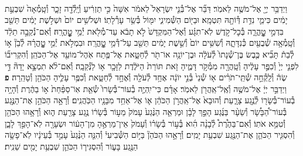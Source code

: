 \documentclass[twoside, openany, parskip=half, 11pt]{book}
\begin{document}
\begin{footnotesize}
\begin{multicols}{2}
\\
וַיְדַבֵּ֥ר יְיָ֖ אֶל־מֹשֶׁ֥ה לֵּאמֹֽר׃ דַּבֵּ֞ר אֶל־בְּ֯נֵ֤י יִשְׂרָאֵל֙ לֵאמֹ֔ר אִשָּׁה֙ כִּ֣י תַזְרִ֔יעַ וְ֯יָֽלְ֯דָ֖ה זָכָ֑ר וְ֯טָֽמְ֯אָה֙ שִׁבְעַ֣ת יָמִ֔ים כִּימֵ֛י נִדַּ֥ת דְּ֯וֹתָ֖הּ תִּטְמָֽא׃ וּבַיּ֖וֹם הַשְּׁ֯מִינִ֑י יִמּ֖וֹל בְּ֯שַׂ֥ר עָרְ֯לָתֽוֹ׃ וּשְׁלֹשִׁ֥ים יוֹם֙ וּשְׁלֹ֣שֶׁת יָמִ֔ים תֵּשֵׁ֖ב בִּדְמֵ֣י טׇׇׇׇׇׇׇׇׇׇׇׇֽהֳרָ֑ה בְּ֯כׇל־קֹ֣דֶשׁ לֹֽא־תִגָּ֗ע וְ֯אֶל־הַמִּקְדָּשׁ֙ לֹ֣א תָבֹ֔א עַד־מְ֯לֹ֖את יְ֯מֵ֥י טׇׇׇׇׇׇׇׇׇׇׇׇׇׇֽהֳרָֽהּ׃  וְ֯אִם־נְ֯קֵבָ֣ה תֵלֵ֔ד וְ֯טָֽמְ֯אָ֥ה שְׁ֯בֻעַ֖יִם כְּ֯נִדָּתָ֑הּ וְ֯שִׁשִּׁ֥ים יוֹם֙ וְ֯שֵׁ֣שֶׁת יָמִ֔ים תֵּשֵׁ֖ב עַל־דְּ֯מֵ֥י טׇׇׇׇׇׇׇׇׇׇׇׇׇׇֽהֳרָֽה׃ וּבִמְלֹ֣את יְ֯מֵ֣י טׇׇׇׇׇׇׇׇׇׇׇׇֽהֳרָ֗הּ לְ֯בֵן֘ א֣וֹ לְ֯בַת֒ תָּבִ֞יא כֶּ֤בֶשׂ בֶּן־שְׁ֯נָתוֹ֙ לְ֯עֹלָ֔ה וּבֶן־יוֹנָ֥ה אוֹ־תֹ֖ר לְ֯חַטָּ֑את אֶל־פֶּ֥תַח אֹֽהֶל־מוֹעֵ֖ד אֶל־הַכֹּהֵֽן׃ וְ֯הִקְרִיב֞וֹ לִפְנֵ֤י יְיָ֙ וְ֯כִפֶּ֣ר עָלֶ֔יהָ וְ֯טָֽהֲרָ֖ה מִמְּ֯קֹ֣ר דָּמֶ֑יהָ זֹ֤את תּוֹרַת֙ הַיֹּלֶ֔דֶת לַזָּכָ֖ר א֥וֹ לַנְּ֯קֵבָֽה׃ וְ֯אִם־לֹ֨א תִמְצָ֣א יָדָהּ֘ דֵּ֣י שֶׂה֒ וְ֯לָֽקְ֯חָ֣ה שְׁ֯תֵּֽי־תֹרִ֗ים א֤וֹ שְׁ֯נֵי֙ בְּ֯נֵ֣י יוֹנָ֔ה אֶחָ֥ד לְ֯עֹלָ֖ה וְ֯אֶחָ֣ד לְ֯חַטָּ֑את וְ֯כִפֶּ֥ר עָלֶ֛יהָ הַכֹּהֵ֖ן וְ֯טָהֵֽרָה׃ \textbf{פ}
וַיְדַבֵּ֣ר יְיָ֔ אֶל־מֹשֶׁ֥ה וְ֯אֶֽל־אַֽהֲרֹ֖ן לֵאמֹֽר׃ אָדָ֗ם כִּי־יִֽהְיֶ֤ה בְ֯עוֹר־בְּ֯שָׂרוֹ֙ שְׂ֯אֵ֤ת אֽוֹ־סַפַּ֨חַת֙ א֣וֹ בַהֶ֔רֶת וְ֯הָיָ֥ה בְ֯עוֹר־בְּ֯שָׂר֖וֹ לְ֯נֶ֣גַע צָרָ֑עַת וְ֯הוּבָא֙ אֶל־אַֽהֲרֹ֣ן הַכֹּהֵ֔ן א֛וֹ אֶל־אַחַ֥ד מִבָּנָ֖יו הַכֹּֽהֲנִֽים׃ וְ֯רָאָ֣ה הַכֹּהֵ֣ן אֶת־הַנֶּ֣גַע בְּ֯עוֹר־הַ֠בָּשָׂ֠ר וְ֯שֵׂעָ֨ר בַּנֶּ֜גַע הָפַ֣ךְ לָבָ֗ן וּמַרְאֵ֤ה הַנֶּ֨גַע֙ עָמֹק֙ מֵע֣וֹר בְּ֯שָׂר֔וֹ נֶ֥גַע צָרַ֖עַת ה֑וּא וְ֯רָאָ֥הוּ הַכֹּהֵ֖ן וְ֯טִמֵּ֥א אֹתֽוֹ׃ וְ֯אִם־בַּהֶ֩רֶת֩ לְ֯בָנָ֨ה הִ֜וא בְּ֯ע֣וֹר בְּ֯שָׂר֗וֹ וְ֯עָמֹק֙ אֵין־מַרְאֶ֣הָ מִן־הָע֔וֹר וּשְׂעָרָ֖ה לֹֽא־הָפַ֣ךְ לָבָ֑ן וְ֯הִסְגִּ֧יר הַכֹּהֵ֛ן אֶת־הַנֶּ֖גַע שִׁבְעַ֥ת יָמִֽים׃ וְ֯רָאָ֣הוּ הַכֹּהֵן֘ בַּיּ֣וֹם הַשְּׁ֯בִיעִי֒ וְ֯הִנֵּ֤ה הַנֶּ֨גַע֙ עָמַ֣ד בְּ֯עֵינָ֔יו לֹֽא־פָשָׂ֥ה הַנֶּ֖גַע בָּע֑וֹר וְ֯הִסְגִּיר֧וֹ הַכֹּהֵ֛ן שִׁבְעַ֥ת יָמִ֖ים שֵׁנִֽית׃


\end{multicols}
\end{footnotesize}
\end{document}
